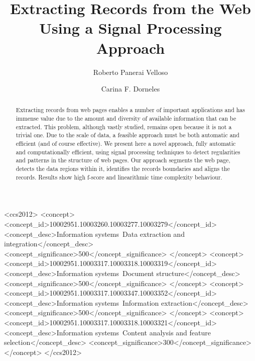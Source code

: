 \documentclass[sigconf]{acmart}
\begin{document}

\fancyhead{}

\title{Extracting Records from the Web Using a Signal Processing Approach}

\author{Roberto Panerai Velloso}

\author{Carina F. Dorneles}

\begin{abstract}
Extracting records from web pages enables a number of important
applications and has immense value due to the amount and diversity of
available information that can be extracted. This problem, although vastly
studied, remains open because it is not a trivial one. Due to the scale of data,
a feasible approach must be both automatic and efficient (and of course
effective). We present here a novel approach, fully automatic and
computationally efficient, using signal processing techniques to detect
regularities and patterns in the structure of web pages. Our approach segments
the web page, detects the data regions within it, identifies the records
boundaries and aligns the records. Results show high f-score and
linearithmic time complexity behaviour.
\end{abstract}

%
%
\begin{CCSXML}
<ccs2012>
<concept>
<concept_id>10002951.10003260.10003277.10003279</concept_id>
<concept_desc>Information systems~Data extraction and integration</concept_desc>
<concept_significance>500</concept_significance>
</concept>
<concept>
<concept_id>10002951.10003317.10003318.10003319</concept_id>
<concept_desc>Information systems~Document structure</concept_desc>
<concept_significance>500</concept_significance>
</concept>
<concept>
<concept_id>10002951.10003317.10003347.10003352</concept_id>
<concept_desc>Information systems~Information extraction</concept_desc>
<concept_significance>500</concept_significance>
</concept>
<concept>
<concept_id>10002951.10003317.10003318.10003321</concept_id>
<concept_desc>Information systems~Content analysis and feature selection</concept_desc>
<concept_significance>300</concept_significance>
</concept>
</ccs2012>
\end{CCSXML}
\end{document}
